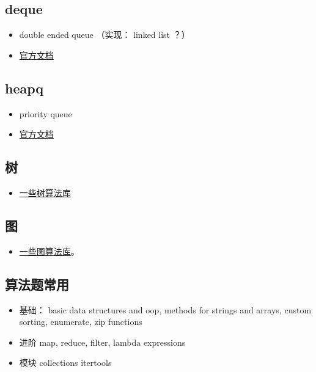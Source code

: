 
\begin{issues}
\issueDraft
\end{issues}

\subsection{deque}
\begin{itemize}
\item double ended queue （实现： linked list ？）
\item \href{https://docs.python.org/3/library/collections.html}{官方文档}
\end{itemize}

\subsection{heapq}
\begin{itemize}
\item priority queue
\item \href{https://docs.python.org/3/library/heapq.html}{官方文档}
\end{itemize}

\subsection{树}
\begin{itemize}
\item \href{https://stackoverflow.com/questions/2442014/tree-libraries-in-python}{一些树算法库}
\end{itemize}


\subsection{图}
\begin{itemize}
\item \href{https://wiki.python.org/moin/PythonGraphLibraries}{一些图算法库}。
\end{itemize}

\subsection{算法题常用}
\begin{itemize}
\item 基础： basic data structures and oop, methods for strings and arrays, custom sorting, enumerate, zip functions
\item 进阶 map, reduce, filter, lambda expressions
\item 模块 collections itertools
\end{itemize}
